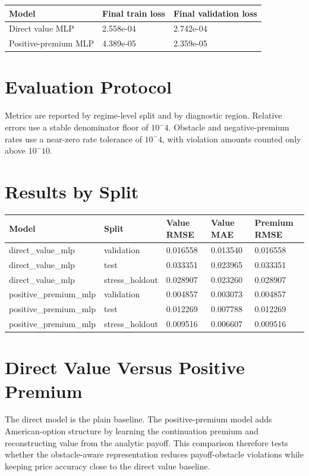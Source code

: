 \documentclass[11pt,a4paper]{article}
\begin{document}
\begin{longtable}{L{0.28\textwidth} L{0.24\textwidth} L{0.24\textwidth}}
\toprule
Model & Final train loss & Final validation loss \\
\midrule
\endhead
Direct value MLP & 2.558e-04 & 2.742e-04 \\
Positive-premium MLP & 4.389e-05 & 2.359e-05 \\
\bottomrule
\end{longtable}

\section{Evaluation Protocol}

Metrics are reported by regime-level split and by diagnostic region. Relative errors use a stable
denominator floor of \(10^-4\). Obstacle and negative-premium rates use a near-zero rate tolerance
of \(10^-4\), with violation amounts counted only above \(10^-10\).

\section{Results by Split}

\begin{longtable}{L{0.24\textwidth} L{0.16\textwidth} L{0.16\textwidth} L{0.16\textwidth} L{0.16\textwidth}}
\toprule
Model & Split & Value RMSE & Value MAE & Premium RMSE \\
\midrule
\endhead
direct\_value\_mlp & validation & 0.016558 & 0.013540 & 0.016558 \\
direct\_value\_mlp & test & 0.033351 & 0.023965 & 0.033351 \\
direct\_value\_mlp & stress\_holdout & 0.028907 & 0.023260 & 0.028907 \\
positive\_premium\_mlp & validation & 0.004857 & 0.003073 & 0.004857 \\
positive\_premium\_mlp & test & 0.012269 & 0.007788 & 0.012269 \\
positive\_premium\_mlp & stress\_holdout & 0.009516 & 0.006607 & 0.009516 \\
\bottomrule
\end{longtable}

\section{Direct Value Versus Positive Premium}

The direct model is the plain baseline. The positive-premium model adds American-option structure by
learning the continuation premium and reconstructing value from the analytic payoff. This comparison
therefore tests whether the obstacle-aware representation reduces payoff-obstacle violations while
keeping price accuracy close to the direct value baseline.
\end{document}

